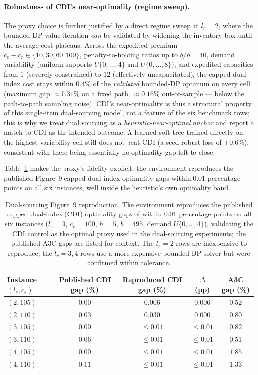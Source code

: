 \documentclass[11pt]{article}
\begin{document}
\paragraph{Robustness of CDI's near-optimality (regime sweep).} The proxy choice is further justified
by a direct regime sweep at $l_r=2$, where the bounded-DP value iteration \emph{can} be validated by
widening the inventory box until the average cost plateaus. Across the expedited premium
$c_e-c_r\in\{10,30,60,100\}$, penalty-to-holding ratios up to $b/h=40$, demand variability (uniform
supports $U\{0,\dots,4\}$ and $U\{0,\dots,8\}$), and expedited capacities from $1$ (severely
constrained) to $12$ (effectively uncapacitated), the capped dual-index cost stays within $0.4\%$ of
the \emph{validated} bounded-DP optimum on every cell (maximum gap $\approx0.31\%$ on a fixed path,
$\approx0.16\%$ out-of-sample --- below the path-to-path sampling noise). CDI's near-optimality is
thus a structural property of this single-item dual-sourcing model, not a feature of the six
benchmark rows; this is why we treat dual sourcing as a \emph{heuristic-near-optimal anchor} and
report a match to CDI as the intended outcome. A learned soft tree trained directly on the
highest-variability cell still does not beat CDI (a seed-robust loss of $+0.6\%$), consistent with
there being essentially no optimality gap left to close.

Table~\ref{tab:ds-figure9-validation} makes the proxy's fidelity explicit: the environment reproduces
the published Figure~9 capped-dual-index optimality gaps within $0.01$ percentage points on all six
instances, well inside the heuristic's own optimality band.

\begin{table}[!htbp]
\centering
\caption{Dual-sourcing Figure~9 reproduction. The environment reproduces the published capped
dual-index (CDI) optimality gaps of \citet{gijsbrechts2022drl} within $0.01$ percentage points on all
six instances ($l_e=0$, $c_r=100$, $h=5$, $b=495$, demand $U\{0,\dots,4\}$), validating the CDI
control as the optimal proxy used in the dual-sourcing experiments; the published A3C gaps are listed
for context. The $l_r=2$ rows are inexpensive to reproduce; the $l_r=3,4$ rows use a more expensive
bounded-DP solver but were confirmed within tolerance.}
\label{tab:ds-figure9-validation}
\begin{tabular}{lcccc}
\toprule
Instance $(l_r,c_e)$ & Published CDI gap (\%) & Reproduced CDI gap (\%) & $\Delta$ (pp) & A3C gap (\%) \\
\midrule
$(2,105)$ & $0.00$ & $0.006$ & $0.006$ & $0.52$ \\
$(2,110)$ & $0.03$ & $0.030$ & $0.000$ & $0.80$ \\
$(3,105)$ & $0.00$ & $\le 0.01$ & $\le 0.01$ & $0.82$ \\
$(3,110)$ & $0.06$ & $\le 0.01$ & $\le 0.01$ & $0.51$ \\
$(4,105)$ & $0.00$ & $\le 0.01$ & $\le 0.01$ & $1.85$ \\
$(4,110)$ & $0.11$ & $\le 0.01$ & $\le 0.01$ & $1.33$ \\
\bottomrule
\end{tabular}
\end{table}
\FloatBarrier
\end{document}
